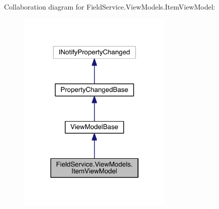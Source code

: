 Collaboration diagram for Field\+Service.\+View\+Models.\+Item\+View\+Model\+:
\nopagebreak
\begin{figure}[H]
\begin{center}
\leavevmode
\includegraphics[width=210pt]{class_field_service_1_1_view_models_1_1_item_view_model__coll__graph}
\end{center}
\end{figure}
